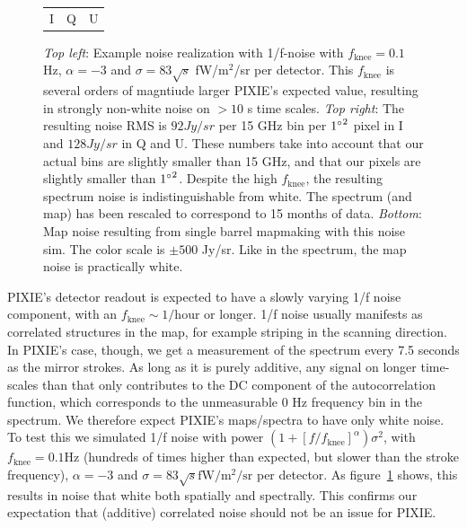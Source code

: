 \documentclass{article}
\begin{document}
\begin{figure}
\begin{tabular}{m{56mm}m{54.4mm}m{56mm}}
		\hspace{32mm}I & \hspace{32mm}Q & \hspace{32mm}U
	\end{tabular}
	\caption{\emph{Top left}: Example noise realization with 1/f-noise with
		$f_\textrm{knee} = 0.1$ Hz, $\alpha=-3$ and $\sigma = 83 \sqrt{s}$
		fW/$\textrm{m}^2$/sr per detector. This $f_\textrm{knee}$ is
		several orders of magntiude larger PIXIE's expected value,
		resulting in strongly non-white noise on $>10$ s time scales.
		\emph{Top right}: The resulting noise RMS is $92 Jy/sr$ per 15 GHz
		bin per ${1\degree}^2$ pixel in I and $128 Jy/sr$ in Q and U. These
		numbers take into account that our actual bins are slightly smaller than
		15 GHz, and that our pixels are slightly smaller than ${1\degree}^2$.
		Despite the high $f_\textrm{knee}$, the resulting spectrum noise is
		indistinguishable from white. The spectrum (and map) has been
		rescaled to correspond to 15 months of data. \emph{Bottom}: Map
		noise resulting from single barrel mapmaking with this noise sim.
		The color scale is $\pm 500$ Jy/sr. Like in the spectrum, the map noise
		is practically white.}
		\label{fig:corrnoise}
\end{figure}
PIXIE's detector readout is expected to have a slowly varying 1/f noise component,
with an $f_\textrm{knee} \sim 1/\textrm{hour}$ or longer. 1/f noise usually manifests as
correlated structures in the map, for example striping in the scanning direction.
In PIXIE's case, though, we get a measurement of the spectrum every 7.5 seconds
as the mirror strokes. As long as it is purely additive, any signal on longer time-scales than that only contributes
to the DC component of the autocorrelation function, which corresponds to the
unmeasurable 0 Hz frequency bin in the spectrum. We therefore expect PIXIE's
maps/spectra to have only white noise. To test this we simulated 1/f noise with
power $(1+[f/f_\textrm{knee}]^\alpha)\sigma^2$, with $f_\textrm{knee} = 0.1 \textrm{Hz}$
(hundreds of times higher than expected, but slower than the stroke frequency),
$\alpha=-3$ and $\sigma = 83\sqrt{s} \textrm{fW}/\textrm{m}^2/\textrm{sr}$ per detector.
As figure~\ref{fig:corrnoise} shows, this results in noise that white both
spatially and spectrally. This confirms our expectation that (additive) correlated
noise should not be an issue for PIXIE.
\end{document}
